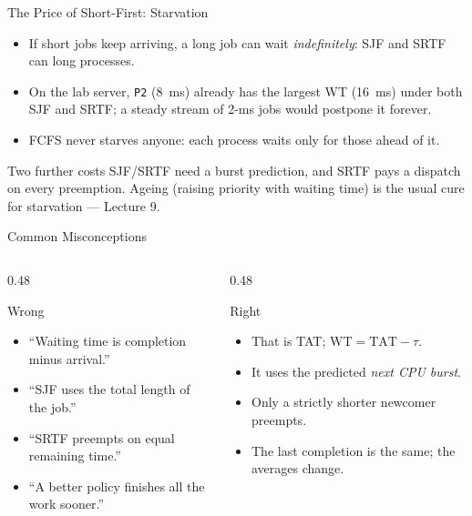 \documentclass[aspectratio=169]{beamer}
\begin{document}
\begin{frame}{The Price of Short-First: Starvation}
  \begin{itemize}
    \item If short jobs keep arriving, a long job can wait
      \emph{indefinitely}: SJF and SRTF can  long processes.
    \item On the lab server, \texttt{P2} (8~ms) already has the largest WT
      (16~ms) under both SJF and SRTF; a steady stream of 2-ms jobs would
      postpone it forever.
    \item FCFS never starves anyone: each process waits only for those ahead
      of it.
  \end{itemize}
  \vspace{0.2cm}
  \begin{block}{Two further costs}
    SJF/SRTF need a burst prediction, and SRTF pays a dispatch on every
    preemption. Ageing (raising priority with waiting time) is the usual
    cure for starvation --- Lecture 9.
  \end{block}
\end{frame}

\begin{frame}{Common Misconceptions}
  \begin{columns}[T]
    \begin{column}{0.48\textwidth}
      \begin{block}{Wrong}
        \begin{itemize}
          \item ``Waiting time is completion minus arrival.''
          \item ``SJF uses the total length of the job.''
          \item ``SRTF preempts on equal remaining time.''
          \item ``A better policy finishes all the work sooner.''
        \end{itemize}
      \end{block}
    \end{column}
    \begin{column}{0.48\textwidth}
      \begin{block}{Right}
        \begin{itemize}
          \item That is TAT; $\mathrm{WT} = \mathrm{TAT} - \tau$.
          \item It uses the predicted \emph{next CPU burst}.
          \item Only a strictly shorter newcomer preempts.
          \item The last completion is the same; the averages change.
        \end{itemize}
      \end{block}
    \end{column}
  \end{columns}
\end{frame}
\end{document}

